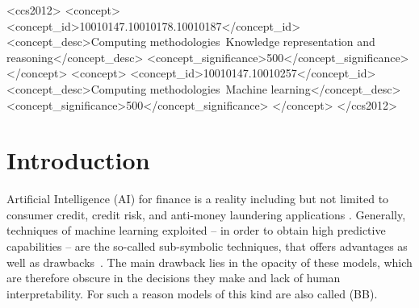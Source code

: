 \documentclass[sigconf]{acmart}
\begin{document}
\begin{CCSXML}
	<ccs2012>
	<concept>
	<concept_id>10010147.10010178.10010187</concept_id>
	<concept_desc>Computing methodologies~Knowledge representation and reasoning</concept_desc>
	<concept_significance>500</concept_significance>
	</concept>
	<concept>
	<concept_id>10010147.10010257</concept_id>
	<concept_desc>Computing methodologies~Machine learning</concept_desc>
	<concept_significance>500</concept_significance>
	</concept>
	</ccs2012>
\end{CCSXML}



\maketitle

\section{Introduction}

Artificial Intelligence (AI) for finance is a reality including but not limited to consumer credit, credit risk, and anti-money laundering applications \cite{aziz2019machine}. 
%
Generally, techniques of machine learning exploited -- in order to obtain high predictive capabilities -- are the so-called sub-symbolic techniques, that offers advantages as well as drawbacks~\cite{rocha2012far}.
%
The main drawback lies in the opacity of these models, which are therefore obscure in the decisions they make and lack of human interpretability.
%
For such a reason models of this kind are also called  (BB).
\end{document}
